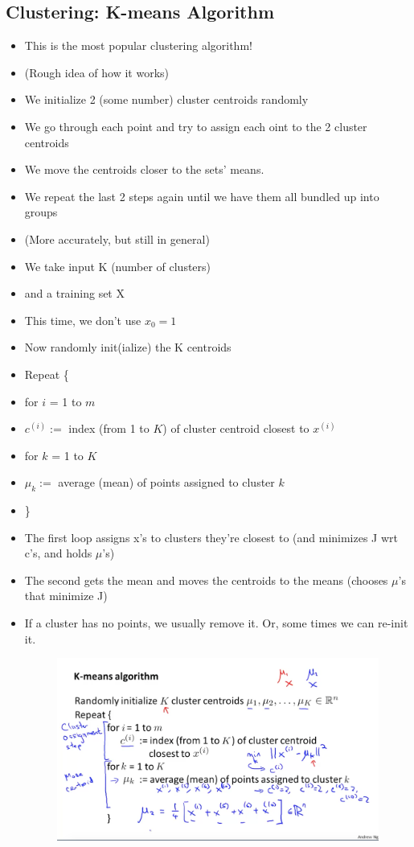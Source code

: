 \documentclass[]{article}
\begin{document}
	\subsection{Clustering: K-means Algorithm}
		\begin{itemize}
			\item This is the most popular clustering algorithm!
			\item (Rough idea of how it works)
			\item We initialize 2 (some number) cluster centroids randomly
			\item We go through each point and try to assign each oint to the 2 cluster centroids
			\item We move the centroids closer to the sets' means.
			\item We repeat the last 2 steps again until we have them all bundled up into groups
			\\
			\item (More accurately, but still in general)
			\item We take input K (number of clusters)
			\item and a training set X
			\item This time, we don't use $x_0=1$
			\item Now randomly init(ialize) the K centroids
			\item Repeat \{
			\item 	for $i$ = 1 to $m$
			\item 		$c^{(i)} :=$ index (from 1 to $K$) of cluster centroid closest to $x^{(i)}$
			\item 	for $k$ = 1 to $K$
			\item 		$\mu_k :=$ average (mean) of points assigned to cluster $k$
			\item \}
			\item The first loop assigns x's to clusters they're closest to (and minimizes J wrt c's, and holds $\mu$'s)
			\item The second gets the mean and moves the centroids to the means (chooses $\mu$'s that minimize J)
			\item If a cluster has no points, we usually remove it. Or, some times we can re-init it.
			\begin{figure}[ht!]
				\includegraphics[width= 1.5\textwidth,center]{K-means_Clustering.png}

\end{figure}
\end{itemize}
\end{document}
